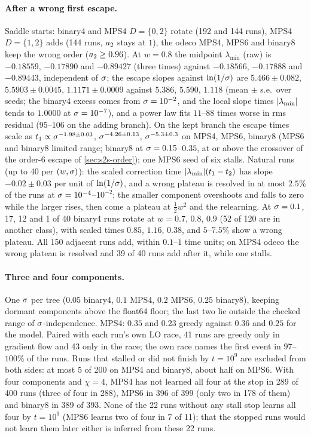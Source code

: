 \paragraph{After a wrong first escape.}
\empirical{} Saddle starts: binary4 and MPS4 $D=\{0,2\}$ rotate (192 and 144 runs), MPS4 $D=\{1,2\}$ adds (144 runs,
$a_{2}$ stays at $1$), the odeco MPS4, MPS6 and binary8 keep the wrong order ($a_{2}\ge0.96$). At $w=0.8$ the midpoint
$\lambda_{\min}$ (raw) is $-0.18559$, $-0.17890$ and $-0.89427$ (three times) against $-0.18566$, $-0.17888$ and
$-0.89443$, independent of $\sigma$; the escape slopes against $\ln(1/\sigma)$ are $5.466\pm0.082$, $5.5903\pm0.0045$,
$1.1171\pm0.0009$ against $5.386$, $5.590$, $1.118$ (mean $\pm$ s.e.\ over seeds; the binary4 excess comes from
$\sigma=10^{-2}$, and the local slope times $\lvert\lambda_{\min}\rvert$ tends to $1.0000$ at $\sigma=10^{-7}$), and a power law
fits $11$--$88$ times worse in rms residual ($95$--$106$ on the adding branch). On the kept branch the escape times
scale as $t_{1}\propto\sigma^{-1.98\pm0.03}$, $\sigma^{-4.26\pm0.13}$, $\sigma^{-5.3\pm0.3}$ on MPS4, MPS6, binary8 (MPS6 and
binary8 limited range; binary8 at $\sigma=0.15$--$0.35$, at or above the crossover of the order-6 escape of
\cref{sec:s2s-order}); one MPS6 seed of six stalls. Natural runs (up to 40 per $(w,\sigma)$): the scaled correction
time $\lvert\lambda_{\min}\rvert(t_{1}-t_{2})$ has slope $-0.02\pm0.03$ per unit of $\ln(1/\sigma)$, and a wrong plateau is
resolved in at most $2.5\%$ of the runs at $\sigma=10^{-4}$--$10^{-2}$; the smaller component overshoots
and falls to zero while the larger rises, then come a plateau at $\frac12w^2$ and the relearning. At $\sigma=0.1$, 17,
12 and 1 of 40 binary4 runs rotate at $w=0.7$, $0.8$, $0.9$ (52 of 120 are in another class), with scaled times
$0.85$, $1.16$, $0.38$, and $5$--$7.5\%$ show a wrong plateau. All 150 adjacent runs add, within $0.1$--$1$ time units; on
MPS4 odeco the wrong plateau is resolved and 39 of 40 runs add after it, while one stalls.

\paragraph{Three and four components.}
\empirical{} One $\sigma$ per tree ($0.05$ binary4, $0.1$ MPS4, $0.2$ MPS6, $0.25$ binary8), keeping dormant components
above the float64 floor; the last two lie outside the checked range of $\sigma$-independence. MPS4: $0.35$ and $0.23$
greedy against $0.36$ and $0.25$ for the model. Paired with each run's own LO race, 41 runs are greedy only in
gradient flow and 43 only in the race; the own race names the first event in $97$--$100\%$ of the runs. Runs that stalled or did not finish by $t=10^9$ are excluded from both sides:
at most 5 of 200 on MPS4 and binary8, about half on MPS6. With four components and $\chi=4$, MPS4 has not learned all
four at the stop in 289 of 400 runs (three of four in 288), MPS6 in 396 of 399 (only two in 178 of them) and binary8 in
389 of 393. None of the 22 runs without any stall stop learns all four by $t=10^9$ (MPS6 learns two of four in 7 of
11); that the stopped runs would not learn them later either is inferred from these 22 runs.

